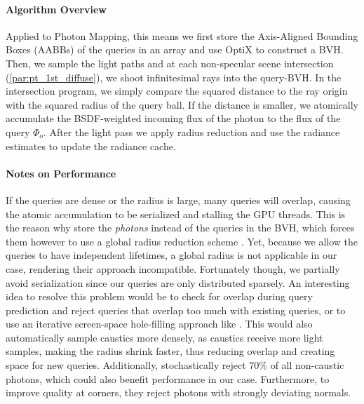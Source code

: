 \paragraph{Algorithm Overview}
Applied to Photon Mapping, this means we first store the Axis-Aligned Bounding Boxes (AABBs) of the queries in an array and use OptiX to construct a BVH.
Then, we sample the light paths and at each non-specular scene intersection (\cref{par:pt_1st_diffuse}), we shoot infinitesimal rays into the query-BVH.
In the intersection program, we simply compare the squared distance to the ray origin with the squared radius of the query ball.
If the distance is smaller, we atomically accumulate the BSDF-weighted incoming flux of the photon to the flux of the query $\Phi_o$.
After the light pass we apply radius reduction and use the radiance estimates to update the radiance cache.

\paragraph{Notes on Performance}
If the queries are dense or the radius is large, many queries will overlap, causing the atomic accumulation to be serialized and stalling the GPU threads.
This is the reason why \textcite{kern2023} store the \emph{photons} instead of the queries in the BVH, which forces them however to use a global radius reduction scheme \parencite{knaus2011}.
Yet, because we allow the queries to have independent lifetimes, a global radius is not applicable in our case, rendering their approach incompatible.
Fortunately though, we partially avoid serialization since our queries are only distributed sparsely.
An interesting idea to resolve this problem would be to check for overlap during query prediction and reject queries that overlap too much with existing queries, or to use an iterative screen-space hole-filling approach like \textcite{stachowiak2018}.
This would also automatically sample caustics more densely, as caustics receive more light samples, making the radius shrink faster, thus reducing overlap and creating space for new queries.
Additionally, \textcite{kern2023} stochastically reject $70\%$ of all non-caustic photons, which could also benefit performance in our case.
Furthermore, to improve quality at corners, they reject photons with strongly deviating normals.

